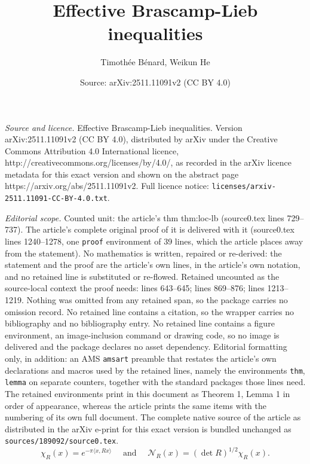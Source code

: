 \documentclass[10pt,a4paper]{amsart}
\title{Effective Brascamp-Lieb inequalities}
\author{Timoth\'ee B\'enard, Weikun He}
\date{Source: arXiv:2511.11091v2 (CC BY 4.0)}
\newcommand{\sN}{\mathscr{N}}
\begin{document}
\maketitle

\noindent\emph{Source and licence.} Effective Brascamp-Lieb inequalities. Version arXiv:2511.11091v2 (CC BY 4.0), distributed by arXiv under the Creative Commons Attribution 4.0 International licence, http://creativecommons.org/licenses/by/4.0/, as recorded in the arXiv licence metadata for this exact version and shown on the abstract page https://arxiv.org/abs/2511.11091v2. Full licence notice: \texttt{licenses/arxiv-2511.11091-CC-BY-4.0.txt}.\par\smallskip

\noindent\textit{Editorial scope.} Counted unit: the article's thm thm:loc-lb (source0.tex lines 729--737). The article's complete original proof of it is delivered with it (source0.tex lines 1240--1278, one \texttt{proof} environment of 39 lines, which the article places away from the statement). No mathematics is written, repaired or re-derived: the statement and the proof are the article's own lines, in the article's own notation, and no retained line is substituted or re-flowed.  Retained uncounted as the source-local context the proof needs: lines 643--645; lines 869--876; lines 1213--1219.  Nothing was omitted from any retained span, so the package carries no omission record.  No retained line contains a citation, so the wrapper carries no bibliography and no bibliography entry.  No retained line contains a figure environment, an image-inclusion command or drawing code, so no image is delivered and the package declares no asset dependency.  Editorial formatting only, in addition: an AMS \texttt{amsart} preamble that restates the article's own declarations and macros used by the retained lines, namely the environments \texttt{thm}, \texttt{lemma} on separate counters, together with the standard packages those lines need.  The retained environments print in this document as Theorem 1, Lemma 1 in order of appearance, whereas the article prints the same items with the numbering of its own full document.  The complete native source of the article as distributed in the arXiv e-print for this exact version is bundled unchanged as \texttt{sources/189092/source0.tex}.
\begin{equation}\label{def-chi-sN}
\chi_{R}(x)= e^{- \pi \langle x, R x \rangle } \quad \text{ and }\quad \sN_{R}(x)=(\det R)^{1/2}\chi_{R}(x).
\end{equation}
\end{document}
